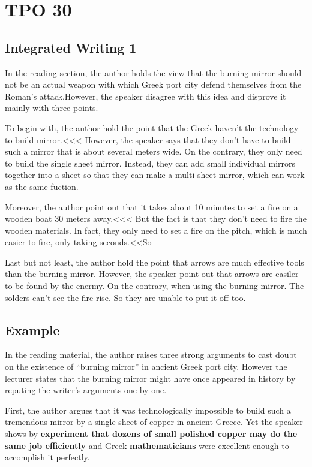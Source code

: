 \section{TPO 30}

\subsection{Integrated Writing 1}

In the reading section, the author holds the view that the burning mirror should not be an actual weapon with which Greek port city defend themselves from the Roman's attack.However, the speaker disagree with this idea and disprove it mainly with three points.

To begin with, the author hold the point that the Greek haven't the technology to build mirror.<<< However, the speaker says that they don't have to build such a mirror that is about several meters wide. On the contrary, they only need to build the single sheet mirror. Instead, they can add small individual mirrors together into a sheet so that they can make a multi-sheet mirror, which can work as the same fuction.

Moreover, the author point out that it takes about 10 minutes to set a fire on a wooden boat 30 meters away.<<< But the fact is that they don't need to fire the wooden materials. In fact, they only need to set a fire on the pitch, which is much easier to fire, only taking seconds.<<So

Last but not least, the author hold the point that arrows are much effective tools than the burning mirror. However, the speaker point out that arrows are easiler to be found by the enermy. On the contrary, when using the burning mirror. The solders can't see the fire rise. So they are unable to put it off too.

\subsection{Example}

In the reading material, the author raises three strong arguments to cast doubt on the existence of “burning mirror” in ancient Greek port city. However the lecturer states that the burning mirror might have once appeared in history by reputing the writer’s arguments one by one.

First, the author argues that it was technologically impossible to build such a tremendous mirror by a single sheet of copper in ancient Greece. Yet the speaker shows by \textbf{experiment that dozens of small polished copper may do the same job efficiently} and Greek \textbf{mathematicians} were excellent enough to accomplish it perfectly.

